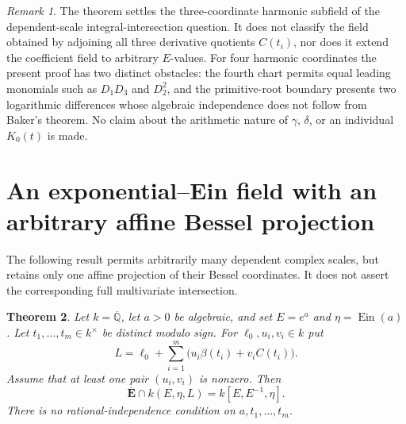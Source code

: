 \documentclass[11pt,a4paper]{article}
\newtheorem{theorem}{Theorem}[section]
\theoremstyle{definition}\newtheorem{definition}[theorem]{Definition}
\theoremstyle{remark}\newtheorem{remark}[theorem]{Remark}
\begin{document}
\begin{remark}\label{ext:th3:scope}
The theorem settles the three-coordinate harmonic subfield of the
dependent-scale integral-intersection question.  It does not classify
the field obtained by adjoining all three derivative quotients $C(t_i)$,
nor does it extend the coefficient field to arbitrary $E$-values.
For four harmonic coordinates the present proof has two distinct
obstacles: the fourth chart permits equal leading monomials such as
$D_1D_3$ and $D_2^2$, and the primitive-root boundary presents two
logarithmic differences whose algebraic independence does not follow
from Baker's theorem.  No claim about the arithmetic nature of
$\gamma$, $\delta$, or an individual $K_0(t)$ is made.
\end{remark}



\section{An exponential--Ein field with an arbitrary affine Bessel projection}
\label{ext:mae:section}

The following result permits arbitrarily many dependent complex scales,
but retains only one affine projection of their Bessel coordinates.  It
does not assert the corresponding full multivariate intersection.

\begin{theorem}\label{ext:mae:main}
Let $k=\overline{\mathbb Q}$, let $a>0$ be algebraic, and set
$E=e^a$ and $\eta=\operatorname{Ein}(a)$.  Let
$t_1,\ldots,t_m\in k^\times$ be distinct modulo sign.  For
$\ell_0,u_i,v_i\in k$ put
\[
 L=\ell_0+\sum_{i=1}^m
             \bigl(u_i\beta(t_i)+v_iC(t_i)\bigr).
\]
Assume that at least one pair $(u_i,v_i)$ is nonzero.  Then
\[
 \boxed{\quad
 \overline{\mathbf E}\cap k(E,\eta,L)
                  =k[E,E^{-1},\eta].\quad}
\]
There is no rational-independence condition on $a,t_1,\ldots,t_m$.
\end{theorem}
\end{document}
